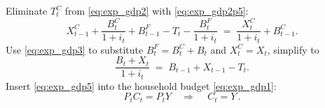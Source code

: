 \documentclass[11pt,aspectratio=169]{beamer}
\begin{document}
\begin{frame}{}
Eliminate $T_t^C$ from \eqref{eq:exp_gdp2} with \eqref{eq:exp_gdp2p5}:
\[
X_{t-1}^{C} + \frac{B_{t}^{C}}{1+i_t} + B_{t-1}^{F} - T_t - \frac{B_t^F}{1+i_t} \;=\; \frac{X_t^C}{1+i_t} + B_{t-1}^{C}.
\]
Use \eqref{eq:exp_gdp3} to substitute $B_t^F=B_t^C+B_t$ and $X_t^C=X_t$, simplify to
\begin{equation} \label{eq:exp_gdp5}
\frac{B_t + X_t}{1+i_t} \;=\; B_{t-1} + X_{t-1} - T_t.
\end{equation}
Insert \eqref{eq:exp_gdp5} into the household budget \eqref{eq:exp_gdp1}:
\[
P_t C_t = P_t Y \quad \Rightarrow \quad \, C_t = Y \, .
\]
\vspace{0.3cm}
\begin{center}
\hyperlink{euler}{}
\end{center}
\end{frame}

\end{document}
